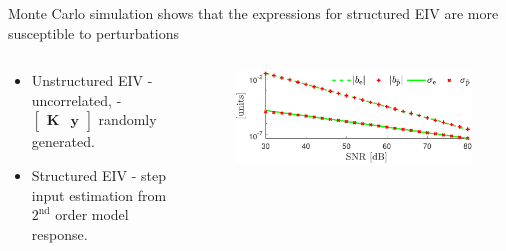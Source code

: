 \documentclass[presentation]{beamer}
\begin{document}
\begin{frame}[label={slide:statistical8}]{Monte Carlo simulation shows that the expressions for structured EIV  are more susceptible to perturbations}
\begin{columns}
\begin{column}{0.35\columnwidth}
\begin{itemize}
	\item Unstructured EIV \linebreak
	\hspace*{-5mm} - uncorrelated, \linebreak
	\hspace*{-5mm} - $\begin{bmatrix} \mathbf{K} &\mathbf{y}\end{bmatrix}$ randomly generated. \linebreak
	\newline
	\item Structured EIV \linebreak
	\hspace*{-5mm} - step input estimation from $2^{\text{nd}}$ order model response. 
\end{itemize}
\end{column}
\begin{column}{0.65\columnwidth}
 \begin{figure}
  \centering
  \includegraphics[width=1\columnwidth]{./fig/Stat_Fig_1u.pdf} 
 \end{figure}
 \begin{figure}

\end{figure}
\end{column}
\end{columns}
\end{frame}
\end{document}
